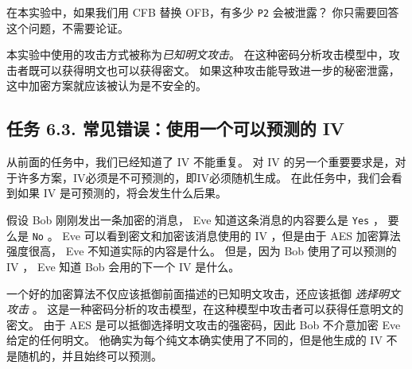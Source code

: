 在本实验中，如果我们用 CFB 替换 OFB，有多少 \texttt{P2} 会被泄露？
你只需要回答这个问题，不需要论证。

本实验中使用的攻击方式被称为\textit{已知明文攻击}。
在这种密码分析攻击模型中，攻击者既可以获得明文也可以获得密文。
如果这种攻击能导致进一步的秘密泄露，这中加密方案就应该被认为是不安全的。





\subsection{任务 6.3. 常见错误：使用一个可以预测的 IV}

从前面的任务中，我们已经知道了 IV 不能重复。
对 IV 的另一个重要要求是，对于许多方案，IV必须是不可预测的，即IV必须随机生成。
在此任务中，我们会看到如果 IV 是可预测的，将会发生什么后果。

假设 Bob 刚刚发出一条加密的消息， Eve 知道这条消息的内容要么是 \texttt{Yes} ，
要么是 \texttt{No} 。
Eve 可以看到密文和加密该消息使用的 IV ，但是由于 AES 加密算法强度很高，
Eve 不知道实际的内容是什么。
但是，因为 Bob 使用了可以预测的 IV ， Eve 知道 Bob 会用的下一个 IV 是什么。




一个好的加密算法不仅应该抵御前面描述的已知明文攻击，还应该抵御 \textit{选择明文攻击} 。
这是一种密码分析的攻击模型，在这种模型中攻击者可以获得任意明文的密文。
由于 AES 是可以抵御选择明文攻击的强密码，因此 Bob 不介意加密 Eve 给定的任何明文。
他确实为每个纯文本确实使用了不同的，但是他生成的 IV 不是随机的，并且始终可以预测。


